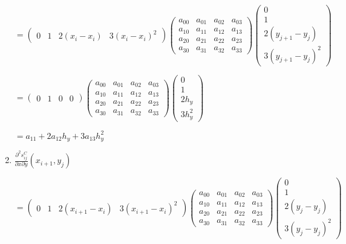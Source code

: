 \documentclass[11pt]{article}
\begin{document}
\begin{enumerate}[label=\textbf{\arabic*)}]
    \begin{flushleft}
    $= \begin{pmatrix}
      0 & 1 & 2(x_i - x_i) & 3(x_i - x_i)^2
    \end{pmatrix}
    \begin{pmatrix}
      a_{00}  & a_{01} & a_{02} & a_{03} \\
      a_{10}  & a_{11} & a_{12} & a_{13} \\
      a_{20}  & a_{21} & a_{22} & a_{23} \\
      a_{30}  & a_{31} & a_{32} & a_{33}
    \end{pmatrix}
    \begin{pmatrix}
      0  \\
      1 \\
      2(y_{j + 1} - y_j)  \\
      3(y_{j + 1} - y_j)^2
    \end{pmatrix}$


    $= \begin{pmatrix}
      0 & 1 & 0 & 0
    \end{pmatrix}
    \begin{pmatrix}
      a_{00}  & a_{01} & a_{02} & a_{03} \\
      a_{10}  & a_{11} & a_{12} & a_{13} \\
      a_{20}  & a_{21} & a_{22} & a_{23} \\
      a_{30}  & a_{31} & a_{32} & a_{33}
    \end{pmatrix}
    \begin{pmatrix}
      0  \\
      1  \\
      2h_y  \\
      3h_y^2
    \end{pmatrix}$

    $= a_{11} + 2a_{12}h_y + 3a_{13}h_y^2$
    \end{flushleft}

    \item $\frac{\partial^2 s_{ij}^C}{\partial x \partial y}(x_{i + 1}, y_j)$

    \begin{flushleft}
    $= \begin{pmatrix}
      0 & 1 & 2(x_{i + 1} - x_i) & 3(x_{i + 1} - x_i)^2
    \end{pmatrix}
    \begin{pmatrix}
      a_{00}  & a_{01} & a_{02} & a_{03} \\
      a_{10}  & a_{11} & a_{12} & a_{13} \\
      a_{20}  & a_{21} & a_{22} & a_{23} \\
      a_{30}  & a_{31} & a_{32} & a_{33}
    \end{pmatrix}
    \begin{pmatrix}
      0  \\
      1 \\
      2(y_j - y_j)  \\
      3(y_j - y_j)^2
    \end{pmatrix}$



\end{flushleft}
\end{enumerate}
\end{document}
